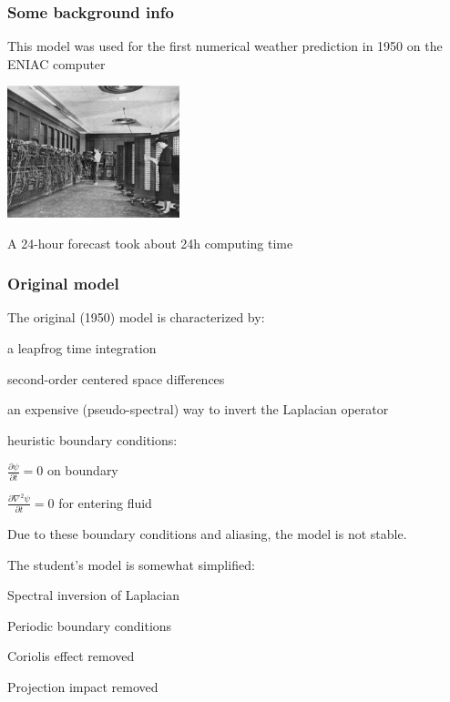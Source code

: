 \documentclass[aspectratio=43,9pt]{beamer}
\begin{document}
%
\begin{frame}
	\frametitle{Some background info}
	\begin{myitemize}{2ex}
		\item This model was used for the first numerical weather prediction in 1950 on the ENIAC computer
			\begin{center}
				\includegraphics[width=5cm]{ENIAC}
			\end{center}
		\item A 24-hour forecast took about 24h computing time
	\end{myitemize}
\end{frame}
%
%
\begin{frame}
	\frametitle{Original model}
	The original (1950) model is characterized by:
	\begin{myitemize}{1ex}
		\item a leapfrog time integration
		\item second-order centered space differences
		\item an expensive (pseudo-spectral) way to invert the Laplacian operator
		\item heuristic boundary conditions:
			\begin{myitemize}{1ex}
				\item $\frac{\partial \psi}{\partial t}=0$ on boundary
				\item $\frac{\partial \nabla^2 \psi}{\partial t}=0$ for entering fluid
			\end{myitemize}
	\end{myitemize}
	Due to these boundary conditions and aliasing, the model is not stable.
	\par\vspace*{4ex}
	The student's model is somewhat simplified:
	\begin{myitemize}{1ex}
		\item Spectral inversion of Laplacian
		\item Periodic boundary conditions
		\item Coriolis effect removed
		\item Projection impact removed
	\end{myitemize}
\end{frame}
\end{document}
